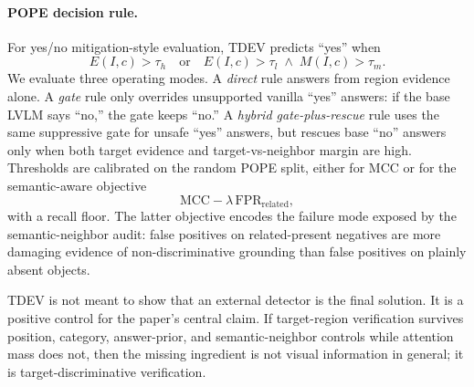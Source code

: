 \paragraph{POPE decision rule.}
For yes/no mitigation-style evaluation, TDEV predicts ``yes'' when
\begin{equation}
E(I,c)>\tau_h\quad\textrm{or}\quad E(I,c)>\tau_l \;\land\; M(I,c)>\tau_m.
\end{equation}
We evaluate three operating modes. A \emph{direct} rule answers from region evidence alone. A \emph{gate} rule only overrides unsupported vanilla ``yes'' answers: if the base LVLM says ``no,'' the gate keeps ``no.'' A \emph{hybrid gate-plus-rescue} rule uses the same suppressive gate for unsafe ``yes'' answers, but rescues base ``no'' answers only when both target evidence and target-vs-neighbor margin are high. Thresholds are calibrated on the random POPE split, either for MCC or for the semantic-aware objective
\begin{equation}
\mathrm{MCC} - \lambda\,\mathrm{FPR}_{\mathrm{related}},
\end{equation}
with a recall floor. The latter objective encodes the failure mode exposed by the semantic-neighbor audit: false positives on related-present negatives are more damaging evidence of non-discriminative grounding than false positives on plainly absent objects.

TDEV is not meant to show that an external detector is the final solution. It is a positive control for the paper's central claim. If target-region verification survives position, category, answer-prior, and semantic-neighbor controls while attention mass does not, then the missing ingredient is not visual information in general; it is target-discriminative verification.
